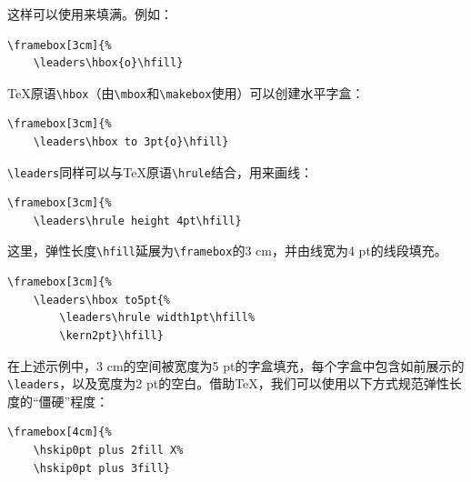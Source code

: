这样可以使用来填满。例如：

\begin{codelist}[10.13]{
}
\begin{verbatim}
\framebox[3cm]{%
    \leaders\hbox{o}\hfill}\end{verbatim}
\end{codelist}

\TeX 原语\verb|\hbox|（由\verb|\mbox|和\verb|\makebox|使用）可以创建水平字盒：

\begin{codelist}[10.14]{
}
\begin{verbatim}
\framebox[3cm]{%
    \leaders\hbox to 3pt{o}\hfill}\end{verbatim}
\end{codelist}

\verb|\leaders|同样可以与\TeX 原语\verb|\hrule|结合，用来画线：

\begin{codelist}[10.15]{
}
\begin{verbatim}
\framebox[3cm]{%
    \leaders\hrule height 4pt\hfill}\end{verbatim}
\end{codelist}

这里，弹性长度\verb|\hfill|延展为\verb|\framebox|的3 cm，并由线宽为4 pt的线段填充。

\begin{codelist}[10.16]{
}
\begin{verbatim}
\framebox[3cm]{%
    \leaders\hbox to5pt{%
        \leaders\hrule width1pt\hfill%
        \kern2pt}\hfill}\end{verbatim}
\end{codelist}

在上述示例中，3 cm的空间被宽度为5 pt的字盒填充，每个字盒中包含如前展示的\verb|\leaders|，以及宽度为2 pt的空白。借助\TeX ，我们可以使用以下方式规范弹性长度的“僵硬”程度：

\begin{codelist}[10.17]{
}
\begin{verbatim}
\framebox[4cm]{%
    \hskip0pt plus 2fill X%
    \hskip0pt plus 3fill}\end{verbatim}
\end{codelist}

